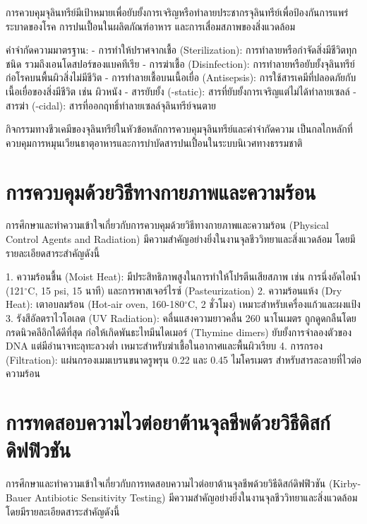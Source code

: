 การควบคุมจุลินทรีย์มีเป้าหมายเพื่อยับยั้งการเจริญหรือทำลายประชากรจุลินทรีย์เพื่อป้องกันการแพร่ระบาดของโรค การปนเปื้อนในผลิตภัณฑ์อาหาร และการเสื่อมสภาพของสิ่งแวดล้อม

คำจำกัดความมาตรฐาน:
- การทำให้ปราศจากเชื้อ (Sterilization): การทำลายหรือกำจัดสิ่งมีชีวิตทุกชนิด รวมถึงเอนโดสปอร์ของแบคทีเรีย
- การฆ่าเชื้อ (Disinfection): การทำลายหรือยับยั้งจุลินทรีย์ก่อโรคบนพื้นผิวสิ่งไม่มีชีวิต
- การทำลายเชื้อบนเนื้อเยื่อ (Antisepsis): การใช้สารเคมีที่ปลอดภัยกับเนื้อเยื่อของสิ่งมีชีวิต เช่น ผิวหนัง
- สารยับยั้ง (-static): สารที่ยับยั้งการเจริญแต่ไม่ได้ทำลายเซลล์
- สารฆ่า (-cidal): สารที่ออกฤทธิ์ทำลายเซลล์จุลินทรีย์จนตาย

\begin{conceptbox}
กิจกรรมทางชีวเคมีของจุลินทรีย์ในหัวข้อหลักการควบคุมจุลินทรีย์และคำจำกัดความ เป็นกลไกหลักที่ควบคุมการหมุนเวียนธาตุอาหารและการบำบัดสารปนเปื้อนในระบบนิเวศทางธรรมชาติ
\end{conceptbox}

\section{การควบคุมด้วยวิธีทางกายภาพและความร้อน}

การศึกษาและทำความเข้าใจเกี่ยวกับการควบคุมด้วยวิธีทางกายภาพและความร้อน (Physical Control Agents and Radiation) มีความสำคัญอย่างยิ่งในงานจุลชีววิทยาและสิ่งแวดล้อม โดยมีรายละเอียดสาระสำคัญดังนี้

1. ความร้อนชื้น (Moist Heat): มีประสิทธิภาพสูงในการทำให้โปรตีนเสียสภาพ เช่น การนึ่งอัดไอน้ำ (121$^{\circ}$C, 15 psi, 15 นาที) และการพาสเจอร์ไรซ์ (Pasteurization)
2. ความร้อนแห้ง (Dry Heat): เตาอบลมร้อน (Hot-air oven, 160-180$^{\circ}$C, 2 ชั่วโมง) เหมาะสำหรับเครื่องแก้วและผงแป้ง
3. รังสีอัลตราไวโอเลต (UV Radiation): คลื่นแสงความยาวคลื่น 260 นาโนเมตร ถูกดูดกลืนโดยกรดนิวคลีอิกได้ดีที่สุด ก่อให้เกิดพันธะไทมีนไดเมอร์ (Thymine dimers) ยับยั้งการจำลองตัวของ DNA แต่มีอำนาจทะลุทะลวงต่ำ เหมาะสำหรับฆ่าเชื้อในอากาศและพื้นผิวเรียบ
4. การกรอง (Filtration): แผ่นกรองเมมเบรนขนาดรูพรุน 0.22 และ 0.45 ไมโครเมตร สำหรับสารละลายที่ไวต่อความร้อน

\section{การทดสอบความไวต่อยาต้านจุลชีพด้วยวิธีดิสก์ดิฟฟิวชัน}

การศึกษาและทำความเข้าใจเกี่ยวกับการทดสอบความไวต่อยาต้านจุลชีพด้วยวิธีดิสก์ดิฟฟิวชัน (Kirby-Bauer Antibiotic Sensitivity Testing) มีความสำคัญอย่างยิ่งในงานจุลชีววิทยาและสิ่งแวดล้อม โดยมีรายละเอียดสาระสำคัญดังนี้

